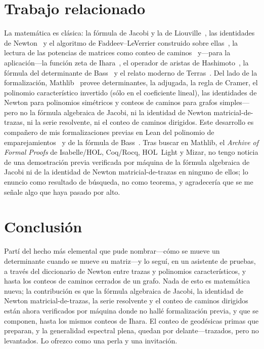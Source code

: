 \documentclass[11pt]{article}
\begin{document}
\section{Trabajo relacionado}
\label{sec:related}

La matem\'atica es cl\'asica: la f\'ormula de Jacobi y la de Liouville~\cite{HornJohnson,MagnusNeudecker},
las identidades de Newton~\cite{Macdonald} y el algoritmo de Faddeev--LeVerrier construido sobre
ellas~\cite{Hou1998}, la lectura de las potencias de matrices como conteo de
caminos~\cite{BrouwerHaemers} y---para la aplicaci\'on---la funci\'on zeta de Ihara~\cite{Ihara1966},
el operador
de aristas de Hashimoto~\cite{Hashimoto1989}, la f\'ormula del determinante de Bass~\cite{Bass1992} y
el relato moderno de Terras~\cite{Terras2011}. Del lado de la formalizaci\'on, Mathlib~\cite{Mathlib2020}
provee determinantes, la adjugada, la regla de Cramer, el polinomio caracter\'istico invertido (s\'olo
en el coeficiente lineal), las identidades de Newton para polinomios sim\'etricos y conteos de caminos
para grafos simples---pero no la f\'ormula algebraica de Jacobi, ni la identidad de Newton
matricial-de-trazas, ni la serie resolvente, ni el conteo de caminos dirigidos. Este desarrollo es
compa\~nero de mis formalizaciones previas en Lean del polinomio de emparejamientos~\cite{PartI,PartII}
y de la f\'ormula de Bass~\cite{IharaBass}. Tras buscar en Mathlib, el \emph{Archive of Formal Proofs}
de Isabelle/HOL, Coq/Rocq, HOL~Light y Mizar, no tengo noticia de una demostraci\'on previa
verificada por m\'aquina de la f\'ormula algebraica de Jacobi ni de la identidad de Newton
matricial-de-trazas en ninguno de ellos; lo enuncio como resultado de b\'usqueda, no como teorema, y
agradecer\'ia que se me se\~nale algo que haya pasado por alto.

\section{Conclusi\'on}

Part\'i del hecho m\'as elemental que pude nombrar---c\'omo se mueve un determinante cuando se mueve su
matriz---y lo segu\'i, en un asistente de pruebas, a trav\'es del diccionario de Newton entre trazas y
polinomios caracter\'isticos, y hasta los conteos de caminos cerrados de un grafo. Nada de esto es
matem\'atica nueva; la contribuci\'on es que la f\'ormula algebraica de Jacobi, la identidad de Newton
matricial-de-trazas, la serie resolvente y el conteo de caminos dirigidos est\'an ahora verificados por
m\'aquina donde no hall\'e formalizaci\'on previa, y que se componen, hasta los mismos conteos de
Ihara. El conteo de geod\'esicas primas que preparan, y la generalidad espectral plena, quedan por
delante---trazados, pero no levantados. Lo ofrezco como una perla y una invitaci\'on.
\end{document}
